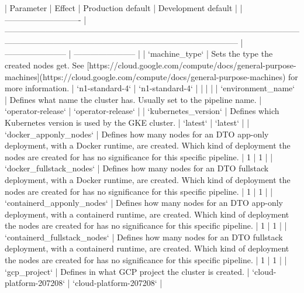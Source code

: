 | Parameter                    | Effect                                                                                                                                                                                             | Production default      | Development default     |
| ---------------------------- | -------------------------------------------------------------------------------------------------------------------------------------------------------------------------------------------------- | ----------------------- | ----------------------- |
| `machine_type`               | Sets the type the created nodes get. See [https://cloud.google.com/compute/docs/general-purpose-machines](https://cloud.google.com/compute/docs/general-purpose-machines) for more information.    | `n1-standard-4`         | `n1-standard-4`         |  |  |  |
| `environment_name`           | Defines what name the cluster has. Usually set to the pipeline name.                                                                                                                               | `operator-release`      | `operator-release`      |
| `kubernetes_version`         | Defines which Kubernetes version is used by the GKE cluster.                                                                                                                                       | `latest`                | `latest`                |
| `docker_apponly_nodes`       | Defines how many nodes for an DTO app-only deployment, with a Docker runtime, are created. Which kind of deployment the nodes are created for has no significance for this specific pipeline.      | 1                       | 1                       |
| `docker_fullstack_nodes`     | Defines how many nodes for an DTO fullstack deployment, with a Docker runtime, are created. Which kind of deployment the nodes are created for has no significance for this specific pipeline.     | 1                       | 1                       |
| `containerd_apponly_nodes`   | Defines how many nodes for an DTO app-only deployment, with a containerd runtime, are created. Which kind of deployment the nodes are created for has no significance for this specific pipeline.  | 1                       | 1                       |
| `containerd_fullstack_nodes` | Defines how many nodes for an DTO fullstack deployment, with a containerd runtime, are created. Which kind of deployment the nodes are created for has no significance for this specific pipeline. | 1                       | 1                       |
| `gcp_project`                | Defines in what GCP project the cluster is created.                                                                                                                                                | `cloud-platform-207208` | `cloud-platform-207208` |
